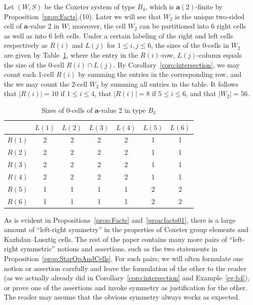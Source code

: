 \documentclass[ALCO,Unicode,published]{cedram}
\newcommand{\la}{\mathbf{a}}
\newcommand{\abs}[1]{\lvert #1 \rvert}
\begin{document}
\begin{example}
    \label{eg:b4}
    Let $(W,S)$ be the Coxeter system of type $B_4$, which is $\la(2)$-finite by
    Proposition~\ref{prop:Facts}.(10). Later we will see that $W_2$ is the unique two-sided cell of $\la$-value
    2 in $W$; moreover, the cell $W_2$ can be partitioned into 6 right cells as well as into 6 left
    cells. Under a certain labeling of the right and left cells respectively as $R(i)$ and $L(j)$
    for $1\le i,j\le 6$, the sizes of the 0-cells in $W_2$ are given by Table~\ref{tab:b4example}, where
    the entry in the $R(i)$-row, $L(j)$-column equals the size of the 0-cell $R(i)\cap L(j)$. By
    Corollary~\ref{coro:intersection}, we may count each 1-cell $R(i)$ by summing the entries in the
    corresponding row, and the we may count the 2-cell $W_2$ by summing all entries in the table.
    It follows that $\abs{R(i)}=10$ if $1\le i\le 4$, that $\abs{R(i)}=8$ if $5\le i\le 6$, and that
    $\abs{W_2}=56$.
    \begin{table} \centering
        \begin{tabular}{|c|c|c|c|c|c|c|} \hline & $L(1)$ & $L(2)$ & $L(3)$ & $L(4)$ & $L(5)$ &
              $L(6)$\\\hline $R(1)$ & 2& 2&  2 & 2 &  1&  1\\\hline $R(2)$ & 2& 2&  2 & 2 &  1&
              1\\\hline $R(3)$ & 2& 2&  2 & 2 & 1&  1\\\hline $R(4)$ & 2& 2&  2 & 2 &  1&  1\\\hline
              $R(5)$ & 1& 1&  1 & 1 &  2&  2\\\hline $R(6)$ & 1& 1&  1 & 1 &  2&  2\\\hline
        \end{tabular} \vspace{1em} \caption{Sizes of 0-cells of $\la$-value 2 in type $B_4$}
        \label{tab:b4example}
    \end{table}
\end{example}

\begin{remark}[Symmetry]
    \label{rmk:symmetry}
    As is evident in Propositions~\ref{prop:Facts} and~\ref{prop:facts01}, there is a large amount
    of ``left-right symmetry'' in the properties of Coxeter group elements and Kazhdan--Lusztig
    cells.  The rest of the paper contains many more pairs of ``left-right symmetric'' notions and
    assertions, such as the two statements in Proposition~\ref{prop:StarOpAndCells}. For such pairs, we will
    often formulate one notion or assertion carefully and leave the formulation of the other to the
    reader (as we actually already did in Corollary~\ref{coro:intersection} and Example~\ref{eg:b4}), or prove one
    of the assertions and invoke symmetry as justification for the other.  The reader may assume
    that the obvious symmetry always works as expected. 
\end{remark}
\end{document}
